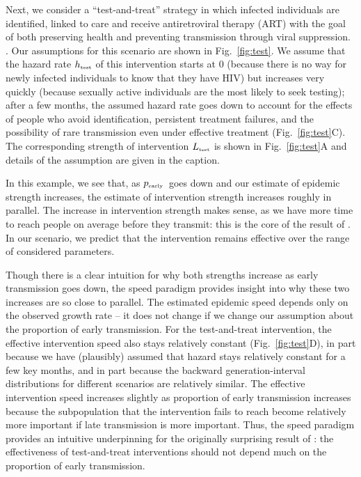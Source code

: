 \documentclass[12pt]{article}
\newcommand{\comment}{RENEW}
\renewcommand{\comment}[3]{\textcolor{#1}{\textbf{[#2: }\textit{#3}\textbf{]}}}
\renewcommand{\comment}[3]{}
\newcommand{\jd}[1]{\comment{cyan}{JD}{#1}}
\newcommand{\tsub}[2]{#1_{{\textrm{\tiny #2}}}}
\newcommand{\pEarly}{\ensuremath{\tsub{p}{early}}}
\newcommand{\figref}[1]{Fig.~\ref{fig:#1}}
\begin{document}
Next, we consider a ``test-and-treat'' strategy in which infected individuals are identified, linked to care and receive antiretroviral therapy (ART) with the goal of both preserving health and preventing transmission through viral suppression. \citep{garnett2009treating, granich2009universal, nah2017test}.
Our assumptions for this scenario are shown in \figref{test}.
We assume that the hazard rate $\tsub{h}{test}$ of this intervention starts at 0 (because there is no way for newly infected individuals to know that they have HIV) but increases very quickly (because sexually active individuals are the most likely to seek testing); 
after a few months, the assumed hazard rate goes down to account for the effects of people who avoid identification, persistent treatment failures, and the possibility of rare transmission even under effective treatment (\figref{test}C). The corresponding strength of intervention $\tsub{L}{test}$ is shown in \figref{test}A and details of the assumption are given in the caption.

In this example, we see that, as \pEarly\ goes down and our estimate of epidemic strength increases, the estimate of intervention strength increases roughly in parallel. The increase in intervention strength makes sense, as we have more time to reach people on average before they transmit: this is the core of the result of \cite{eaton2014proportion}. 
In our scenario, we predict that the intervention remains effective over the range of considered parameters.


Though there is a clear intuition for why both strengths increase as early transmission goes down, the speed paradigm provides insight into why these two increases are so close to parallel.
The estimated epidemic speed depends only on the observed growth rate -- it does not change if we change our assumption about the proportion of early transmission.
For the test-and-treat intervention, the effective intervention speed also stays relatively constant (\figref{test}D), in part because we have (plausibly) assumed that hazard stays relatively constant for a few key months, and in part because the backward generation-interval distributions for different scenarios are relatively similar.
The effective intervention speed increases slightly as proportion of early transmission increases because the subpopulation that the intervention fails to reach become relatively more important if late transmission is more important.
Thus, the speed paradigm provides an intuitive underpinning for the originally surprising result of \cite{eaton2014proportion}: the effectiveness of test-and-treat interventions should not depend much on the proportion of early transmission.
\end{document}
